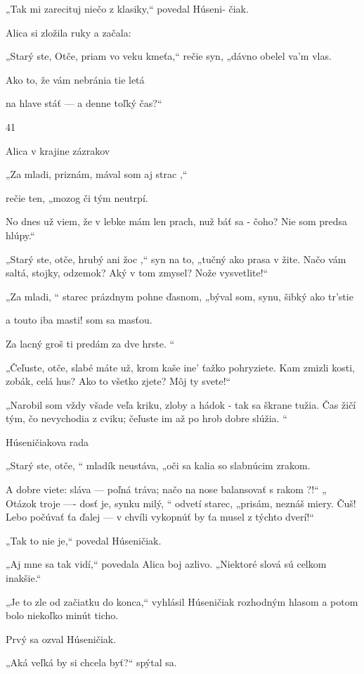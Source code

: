 \documentclass[12pt]{article}
\begin{document}
\begin{Parallel}[p]{}{}
{{„Tak mi zarecituj niečo z klasiky,“ povedal Húseni-
čiak.

Alica si zložila ruky a začala:

„Starý ste, Otče, priam vo veku kmeťa,“
rečie syn, „dávno obelel va'm vlas.

Ako to, že vám nebránia tie letá

na hlave stáť — a denne toľký čas?“

41

Alica v krajine zázrakov

   

„Za mladi, priznám, mával som aj strac ,“

rečie ten, „mozog či tým neutrpí.

No dnes už viem, že v lebke mám len prach,
nuž báť sa - čoho? Nie som predsa hlúpy.“

„Starý ste, otče, hrubý ani žoc ,“
syn na to, „tučný ako prasa v žite.
Načo vám saltá, stojky, odzemok?
Aký v tom zmysel? Nože vysvetlite!“

„Za mladi, “ starec prázdnym pohne ďasnom,
„býval som, synu, šibký ako tr'stie

a touto iba masti! som sa masťou.

Za lacný groš ti predám za dve hrste. “

„Čeľuste, otče, slabé máte už,
krom kaše ine' ťažko pohryziete.
Kam zmizli kosti, zobák, celá hus?
Ako to všetko zjete? Môj ty svete!“

„Narobil som vždy všade veľa kriku,
zloby a hádok - tak sa škrane tužia.
Čas žičí tým, čo nevychodia z cviku;
čeľuste im až po hrob dobre slúžia. “

Húseničiakova rada

„Starý ste, otče, “ mladík neustáva,
„oči sa kalia so slabnúcim zrakom.

A dobre viete: sláva — poľná tráva;
načo na nose balansovať s rakom ?!“
„ Otázok troje —- dosť je, synku milý, “
odvetí starec, „prisám, neznáš miery.
Čuš! Lebo počúvať ťa ďalej — v chvíli
vykopnúť by ťa musel z týchto dverí!“

„Tak to nie je,“ povedal Húseničiak.

„Aj mne sa tak vidí,“ povedala Alica boj azlivo. „Niektoré
slová sú celkom inakšie.“

„Je to zle od začiatku do konca,“ vyhlásil Húseničiak
rozhodným hlasom a potom bolo niekoľko minút ticho.

Prvý sa ozval Húseničiak.

„Aká veľká by si chcela byť?“ spýtal sa.

}}
\end{Parallel}
\end{document}
